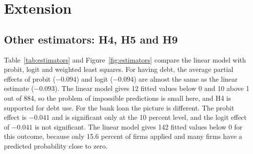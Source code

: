 \documentclass[preprint,letterpaper,11pt,authoryear]{elsarticle}
\begin{document}
\section{Extension}
\label{sec:ext}

\subsection{Other estimators: H4, H5 and H9}

Table~\ref{tab:estimators} and Figure~\ref{fig:estimators} compare the linear model with probit, logit and weighted least squares. For having debt, the average partial effects of probit ($-0.094$) and logit ($-0.094$) are almost the same as the linear estimate ($-0.093$). The linear model gives 12 fitted values below 0 and 10 above 1 out of 884, so the problem of impossible predictions is small here, and H4 is supported for debt use. For the bank loan the picture is different. The probit effect is $-0.041$ and is significant only at the 10 percent level, and the logit effect of $-0.041$ is not significant. The linear model gives 142 fitted values below 0 for this outcome, because only 15.6 percent of firms applied and many firms have a predicted probability close to zero.
\end{document}
